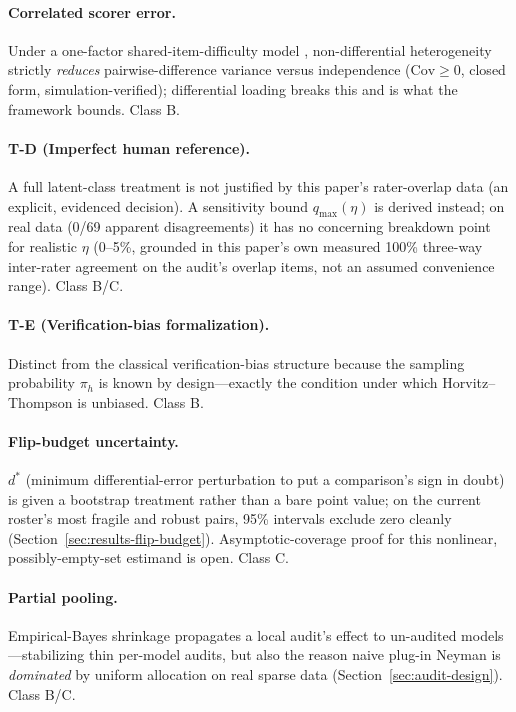 \paragraph{Correlated scorer error.} Under a one-factor shared-item-difficulty
model \citep{dawid1979maximum}, non-differential heterogeneity strictly
\emph{reduces} pairwise-difference variance versus independence
($\mathrm{Cov}\geq0$, closed form, simulation-verified); differential
loading breaks this and is what the framework bounds. Class B.

\paragraph{T-D (Imperfect human reference).} A full latent-class treatment
\citep{hui1980estimating} is not justified by this paper's rater-overlap
data (an explicit, evidenced decision). A sensitivity bound $q_{\max}(\eta)$
is derived instead; on real data (0/69 apparent disagreements) it has no
concerning breakdown point for realistic $\eta$ (0--5\%, grounded in this
paper's own measured 100\% three-way inter-rater agreement on the audit's
overlap items, not an assumed convenience range). Class B/C.

\paragraph{T-E (Verification-bias formalization).} Distinct from the
classical verification-bias structure because the sampling probability
$\pi_h$ is known by design---exactly the condition under which
Horvitz--Thompson \citep{horvitz1952generalization} is unbiased. Class B.

\paragraph{Flip-budget uncertainty.} $d^\ast$ (minimum differential-error
perturbation to put a comparison's sign in doubt) is given a bootstrap
treatment rather than a bare point value; on the current roster's most
fragile and robust pairs, 95\% intervals exclude zero cleanly
(Section~\ref{sec:results-flip-budget}). Asymptotic-coverage proof for this
nonlinear, possibly-empty-set estimand is open. Class C.

\paragraph{Partial pooling.} Empirical-Bayes shrinkage propagates a local
audit's effect to un-audited models---stabilizing thin per-model audits,
but also the reason naive plug-in Neyman is \emph{dominated} by uniform
allocation on real sparse data (Section~\ref{sec:audit-design}). Class B/C.

